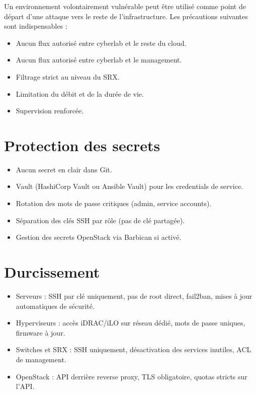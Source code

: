 \begin{warnbox}
Un environnement volontairement vulnérable peut être utilisé comme point de départ d'une attaque vers le reste de l'infrastructure. Les précautions suivantes sont indispensables :
\begin{itemize}
  \item Aucun flux autorisé entre cyberlab et le reste du cloud.
  \item Aucun flux autorisé entre cyberlab et le management.
  \item Filtrage strict au niveau du SRX.
  \item Limitation du débit et de la durée de vie.
  \item Supervision renforcée.
\end{itemize}
\end{warnbox}

\section{Protection des secrets}
\begin{itemize}
  \item Aucun secret en clair dans Git.
  \item Vault (HashiCorp Vault ou Ansible Vault) pour les credentials de service.
  \item Rotation des mots de passe critiques (admin, service accounts).
  \item Séparation des clés SSH par rôle (pas de clé partagée).
  \item Gestion des secrets OpenStack via Barbican si activé.
\end{itemize}

\section{Durcissement}
\begin{itemize}
  \item Serveurs : SSH par clé uniquement, pas de root direct, fail2ban, mises à jour automatiques de sécurité.
  \item Hyperviseurs : accès iDRAC/iLO sur réseau dédié, mots de passe uniques, firmware à jour.
  \item Switches et SRX : SSH uniquement, désactivation des services inutiles, ACL de management.
  \item OpenStack : API derrière reverse proxy, TLS obligatoire, quotas stricts sur l'API.
\end{itemize}


